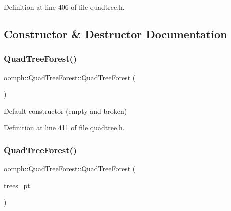 Definition at line 406 of file quadtree.\+h.



\subsection{Constructor \& Destructor Documentation}
\mbox{\label{classoomph_1_1QuadTreeForest_a34304627e767f82740b37a44e6154e0d}} 
\subsubsection{\texorpdfstring{Quad\+Tree\+Forest()}{QuadTreeForest()}\hspace{0.1cm}{\footnotesize\ttfamily [1/3]}}
{\footnotesize\ttfamily oomph\+::\+Quad\+Tree\+Forest\+::\+Quad\+Tree\+Forest (\begin{DoxyParamCaption}{ }\end{DoxyParamCaption})\hspace{0.3cm}{\ttfamily [inline]}}



Default constructor (empty and broken) 



Definition at line 411 of file quadtree.\+h.

\mbox{\label{classoomph_1_1QuadTreeForest_adc6e1e5e288d06b519c3eb3a3fcbdb7a}} 
\subsubsection{\texorpdfstring{Quad\+Tree\+Forest()}{QuadTreeForest()}\hspace{0.1cm}{\footnotesize\ttfamily [2/3]}}
{\footnotesize\ttfamily oomph\+::\+Quad\+Tree\+Forest\+::\+Quad\+Tree\+Forest (\begin{DoxyParamCaption}\item[{\hyperlink{classoomph_1_1Vector}{Vector}$<$ \hyperlink{classoomph_1_1TreeRoot}{Tree\+Root} $\ast$ $>$ \&}]{trees\+\_\+pt }\end{DoxyParamCaption})}



